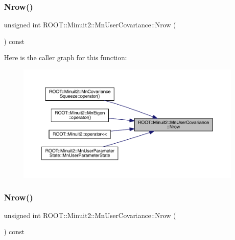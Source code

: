 \mbox{\label{classROOT_1_1Minuit2_1_1MnUserCovariance_a10adc07ae961afea4de48183aa68f6fc}} 
\subsubsection{\texorpdfstring{Nrow()}{Nrow()}\hspace{0.1cm}{\footnotesize\ttfamily [1/2]}}
{\footnotesize\ttfamily unsigned int R\+O\+O\+T\+::\+Minuit2\+::\+Mn\+User\+Covariance\+::\+Nrow (\begin{DoxyParamCaption}{ }\end{DoxyParamCaption}) const\hspace{0.3cm}{\ttfamily [inline]}}

Here is the caller graph for this function\+:\nopagebreak
\begin{figure}[H]
\begin{center}
\leavevmode
\includegraphics[width=350pt]{d4/d72/classROOT_1_1Minuit2_1_1MnUserCovariance_a10adc07ae961afea4de48183aa68f6fc_icgraph}
\end{center}
\end{figure}
\mbox{\label{classROOT_1_1Minuit2_1_1MnUserCovariance_a10adc07ae961afea4de48183aa68f6fc}} 
\subsubsection{\texorpdfstring{Nrow()}{Nrow()}\hspace{0.1cm}{\footnotesize\ttfamily [2/2]}}
{\footnotesize\ttfamily unsigned int R\+O\+O\+T\+::\+Minuit2\+::\+Mn\+User\+Covariance\+::\+Nrow (\begin{DoxyParamCaption}{ }\end{DoxyParamCaption}) const\hspace{0.3cm}{\ttfamily [inline]}}

